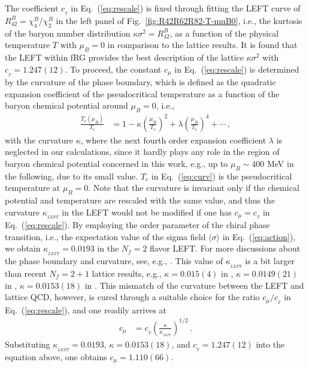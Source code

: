 \documentclass[%
reprint,
superscriptaddress,
showpacs,preprintnumbers,
 amsmath,amssymb,
 aps,
prd,
]{revtex4-1}
\def\Fig#1{Fig.~\ref{#1}} \def\Tab#1{Tab.~\ref{#1}}
\def\Eq#1{Eq.~(\ref{#1})}
\begin{document}
The coefficient $c_{_{T}}$ in \Eq{eq:rescale} is fixed through fitting the LEFT curve of $R^{B}_{42}=\chi^{B}_{4}/\chi^{B}_{2}$ in the left panel of \Fig{fig:R42R62R82-T-muB0}, i.e., the kurtosis of the baryon number distribution $\kappa \sigma^2=R^{B}_{42}$, 
as a function of the physical temperature $T$ with $\mu_B=0$ in comparison to the lattice results. It is found that the LEFT within fRG provides the best description of the lattice $\kappa \sigma^2$ with $c_{_{T}}=1.247(12)$. To proceed, the constant $c_{\mu}$ in \Eq{eq:rescale} is determined by the curvature of the phase boundary, which is defined as the quadratic expansion coefficient of the pseudocritical temperature as a function of the baryon chemical potential around $\mu_B=0$, i.e.,
%
\begin{align}
  \frac{T_c(\mu_B)}{T_c}&=1-\kappa \left(\frac{\mu_B}{T_c}\right)^2+\lambda \left(\frac{\mu_B}{T_c}\right)^4+\cdots\,,\label{eq:curv}
\end{align}
%
with the curvature $\kappa$, where the next fourth order expansion coefficient $\lambda$ is neglected in our calculations, since it hardly plays any role in the region of baryon chemical potential concerned in this work, e.g., up to $\mu_B\sim 400$ MeV in the following, due to its small value. $T_c$ in \Eq{eq:curv} is the pseudocritical temperature at $\mu_B=0$. Note that the curvature is invariant only if the chemical potential and temperature are rescaled with the same value, and thus the curvature $\kappa_{_{LEFT}}$ in the LEFT would not be modified if one has $c_{\mu}=c_{_{T}}$ in \Eq{eq:rescale}. By employing the order parameter of the chiral phase transition, i.e., the expectation value of the sigma field $\langle \sigma \rangle$ in \Eq{eq:action}, we obtain $\kappa_{_{LEFT}}=0.0193$ in the $N_f=2$ flavor LEFT. For more discussions about the phase boundary and curvature, see, e.g., \cite{Fu:2019hdw}. This value of $\kappa_{_{LEFT}}$ is a bit larger than recent $N_f = 2+1$ lattice results, e.g., $\kappa=0.015(4)$ in \cite{Bazavov:2018mes}, $\kappa=0.0149(21)$ in \cite{Bellwied:2015rza}, $\kappa=0.0153(18)$ in \cite{Borsanyi:2020fev}. This mismatch of the curvature between the LEFT and lattice QCD, however, is cured through a suitable choice for the ratio $c_{\mu}/c_{_{T}}$ in \Eq{eq:rescale}, and one readily arrives at
%
\begin{align}
  c_{\mu}&=c_{_{T}}\left(\frac{\kappa}{\kappa_{_{LEFT}}}\right)^{1/2}\,.\label{eq:cmu}
\end{align}
%
Substituting $\kappa_{_{LEFT}}=0.0193$, $\kappa=0.0153(18)$, and $c_{_{T}}=1.247(12)$ into the equation above, one obtains $c_{\mu}=1.110(66)$.
\end{document}
